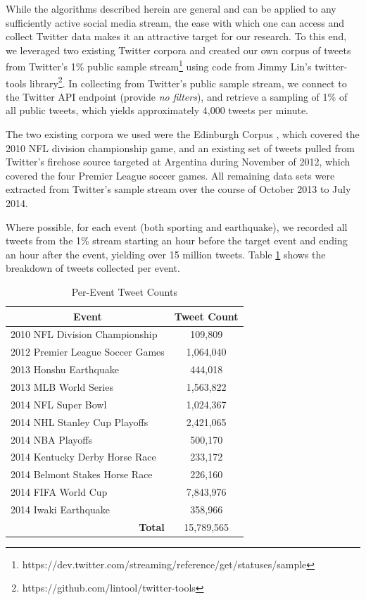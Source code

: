 \documentclass[letterpaper]{article}
\begin{document}
While the algorithms described herein are general and can be applied to any sufficiently active social media stream, the ease with which one can access and collect Twitter data makes it an attractive target for our research.
To this end, we leveraged two existing Twitter corpora and created our own corpus of tweets from Twitter's 1\% public sample stream\footnote{https://dev.twitter.com/streaming/reference/get/statuses/sample} using code from Jimmy Lin's twitter-tools library\footnote{https://github.com/lintool/twitter-tools}.
In collecting from Twitter's public sample stream, we connect to the Twitter API endpoint (provide \emph{no filters}), and retrieve a sampling of 1\% of all public tweets, which yields approximately 4,000 tweets per minute.

The two existing corpora we used were the Edinburgh Corpus \cite{Petrovic:2010:ETC:1860667.1860680}, which covered the 2010 NFL division championship game, and an existing set of tweets pulled from Twitter's firehose source targeted at Argentina during November of 2012, which covered the four Premier League soccer games.
All remaining data sets were extracted from Twitter's sample stream over the course of October 2013 to July 2014.

Where possible, for each event (both sporting and earthquake), we recorded all tweets from the 1\% stream starting an hour before the target event and ending an hour after the event, yielding over 15 million tweets.
Table \ref{tab:tweetCounts} shows the breakdown of tweets collected per event.

\begin{table}[htdp]
\footnotesize
\caption{Per-Event Tweet Counts}
\begin{center}
\begin{tabular}{|p{2in}|c|}
\hline
\multicolumn{1}{|c|}{\textbf{Event}} & \textbf{Tweet Count} \\ \hline
2010 NFL Division Championship & 109,809 \\ \hline
2012 Premier League Soccer Games & 1,064,040 \\ \hline
2013 Honshu Earthquake  & 444,018 \\ \hline
2013 MLB World Series  & 1,563,822 \\ \hline
2014 NFL Super Bowl & 1,024,367 \\ \hline
2014 NHL Stanley Cup Playoffs & 2,421,065 \\ \hline
2014 NBA Playoffs & 500,170 \\ \hline
2014 Kentucky Derby Horse Race & 233,172 \\ \hline
2014 Belmont Stakes Horse Race & 226,160 \\ \hline
2014 FIFA World Cup & 7,843,976 \\ \hline
2014 Iwaki Earthquake  & 358,966 \\ \hline
\multicolumn{1}{|r|}{\textbf{Total}} &  15,789,565  \\ \hline
\end{tabular}
\end{center}
\label{tab:tweetCounts}
\end{table}
\end{document}
